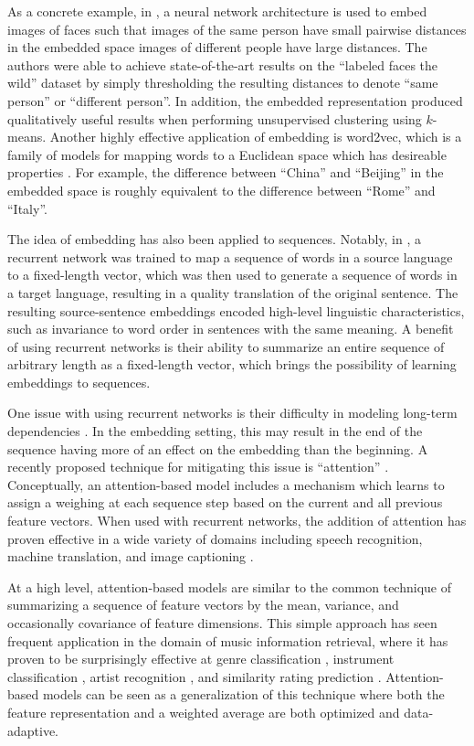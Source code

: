 \documentclass{article}
\begin{document}
As a concrete example, in \cite{schroff2015facenet}, a neural network architecture is used to embed images of faces such that images of the same person have small pairwise distances in the embedded space images of different people have large distances.
The authors were able to achieve state-of-the-art results on the ``labeled faces the wild'' dataset by simply thresholding the resulting distances to denote ``same person'' or ``different person''.
In addition, the embedded representation produced qualitatively useful results when performing unsupervised clustering using $k$-means.
Another highly effective application of embedding is word2vec, which is a family of models for mapping words to a Euclidean space which has desireable properties \cite{mikolov2013distributed}.
For example, the difference between ``China'' and ``Beijing'' in the embedded space is roughly equivalent to the difference between ``Rome'' and ``Italy''.

The idea of embedding has also been applied to sequences.
Notably, in \cite{sutskever2014sequence}, a recurrent network was trained to map a sequence of words in a source language to a fixed-length vector, which was then used to generate a sequence of words in a target language, resulting in a quality translation of the original sentence.
The resulting source-sentence embeddings encoded high-level linguistic characteristics, such as invariance to word order in sentences with the same meaning.
A benefit of using recurrent networks is their ability to summarize an entire sequence of arbitrary length as a fixed-length vector, which brings the possibility of learning embeddings to sequences.

One issue with using recurrent networks is their difficulty in modeling long-term dependencies \cite{bengio1994learning}.
In the embedding setting, this may result in the end of the sequence having more of an effect on the embedding than the beginning.
A recently proposed technique for mitigating this issue is ``attention'' \cite{bahdanau2014neural}.
Conceptually, an attention-based model includes a mechanism which learns to assign a weighing at each sequence step based on the current and all previous feature vectors.
When used with recurrent networks, the addition of attention has proven effective in a wide variety of domains including speech recognition, machine translation, and image captioning \cite{cho2015describing}.

At a high level, attention-based models are similar to the common technique of summarizing a sequence of feature vectors by the mean, variance, and occasionally covariance of feature dimensions.
This simple approach has seen frequent application in the domain of music information retrieval, where it has proven to be surprisingly effective at genre classification \cite{bergstra2006aggregate, tzanetakis2002musical}, instrument classification \cite{deng2008study}, artist recognition \cite{mandel2005song}, and similarity rating prediction \cite{foster2014sequential}.
Attention-based models can be seen as a generalization of this technique where both the feature representation and a weighted average are both optimized and data-adaptive.
\end{document}
